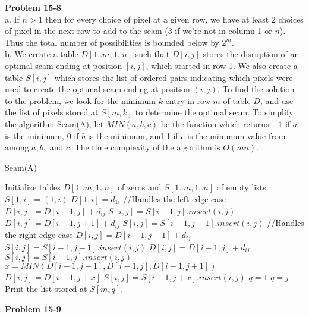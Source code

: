 \documentclass{article}
\begin{document}
\noindent\textbf{Problem 15-8}\\

a. If $n>1$ then for every choice of pixel at a given row, we have at least 2 choices of pixel in the next row to add to the seam (3 if we're not in column 1 or $n$).  Thus the total number of possibilities is bounded below by $2^m$. \\

b. We create a table $D[1..m,1..n]$ such that $D[i,j]$ stores the disruption of an optimal seam ending at position $[i,j]$, which started in row 1.  We also create a table $S[i,j]$ which stores the list of ordered pairs indicating which pixels were used to create the optimal seam ending at position $(i,j)$.  To find the solution to the problem, we look for the minimum $k$ entry in row $m$ of table $D$, and use the list of pixels stored at $S[m,k]$ to determine the optimal seam.  To simplify the algorithm Seam(A), let $MIN(a,b,c)$ be the function which returns $-1$ if $a$ is the minimum, 0 if $b$ is the minimum, and 1 if $c$ is the minimum value from among $a, b, $ and $c$.  The time complexity of the algorithm is $O(mn)$.\\

\begin{algorithm}
\caption{Seam(A)}
\begin{algorithmic}
\State Initialize tables $D[1..m,1..n]$ of zeros and $S[1..m,1..n]$ of empty lists
	\State $S[1,i] = (1,i)$
	\State $D[1,i] = d_{1i}$
\EndFor
{}
		 //Handles the left-edge case
				\State $D[i,j] = D[i-1,j] + d_{ij}$
				\State $S[i,j] = S[i-1,j].insert(i,j)$
			\Else
				\State $D[i,j] = D[i-1,j+1] + d_{ij}$
				\State $S[i,j] = S[i-1,j+1].insert(i,j)$
			\EndIf
		 //Handles the right-edge case
				\State $D[i,j] = D[i-1,j-1] + d_{ij}$
				\State $S[i,j] = S[i-1,j-1].insert(i,j)$
			\Else
				\State $D[i,j] = D[i-1,j] + d_{ij}$
				\State $S[i,j] = S[i-1,j].insert(i,j)$
			\EndIf
		\EndIf
		\State $x = MIN(D[i-1,j-1], D[i-1,j], D[i-1,j+1])$
		\State $D[i,j] = D[i-1,j+x]$
		\State $S[i,j] = S[i-1,j+x].insert(i,j)$
	\EndFor
\EndFor
\State $q = 1$
		$q = j$
	\EndIf
\EndFor
\State Print the list stored at $S[m,q]$.
\end{algorithmic}
\end{algorithm}

\noindent\textbf{Problem 15-9}\\
\end{document}
